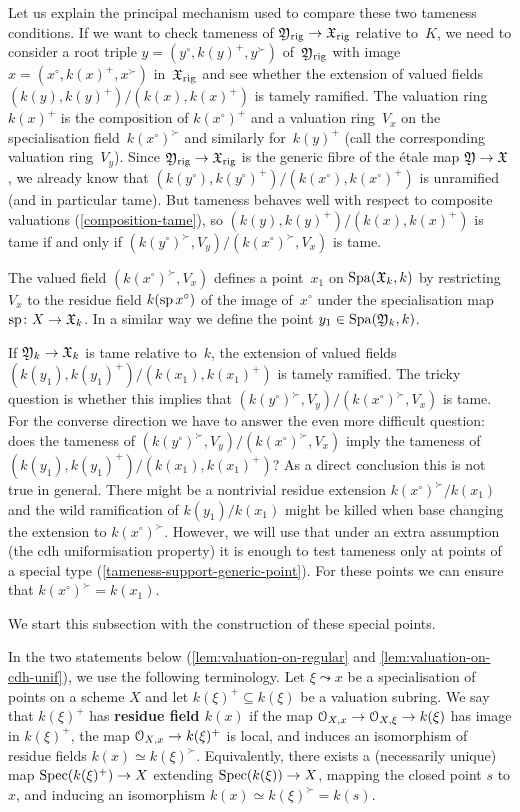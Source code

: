 \begin{rmk}
Let us explain the principal mechanism used to compare these two tameness conditions.
If we want to check tameness of ${\mathfrak{Y}}_{\rm rig} \to {\mathfrak{X}}_{\rm rig}$ relative to~$K$, we need to consider a root triple $y = (y^\circ,k(y)^+,y^\succ)$ of~${\mathfrak{Y}}_{\rm rig}$ with image $x = (x^\circ,k(x)^+,x^\succ)$ in~${\mathfrak{X}}_{\rm rig}$ and see whether the extension of valued fields $(k(y),k(y)^+)/(k(x),k(x)^+)$ is tamely ramified.
The valuation ring~$k(x)^+$ is the composition of $k(x^\circ)^+$ and a valuation ring~$V_x$ on the specialisation field~$k(x^\circ)^\succ$ and similarly for~$k(y)^+$ (call the corresponding valuation ring~$V_y$).
Since ${\mathfrak{Y}}_{\rm rig} \to {\mathfrak{X}}_{\rm rig}$ is the generic fibre of the \'etale map ${\mathfrak{Y}}\to {\mathfrak{X}}$, we already know that $(k(y^\circ),k(y^\circ)^+)/(k(x^\circ),k(x^\circ)^+)$ is unramified (and in particular tame).
But tameness behaves well with respect to composite valuations (\cref{composition-tame}), so $(k(y),k(y)^+)/(k(x),k(x)^+)$ is tame if and only if $(k(y^\circ)^\succ,V_y)/(k(x^\circ)^\succ,V_x)$ is tame.

The valued field $(k(x^\circ)^\succ,V_x)$ defines a point~$x_1$ on $\operatorname{Spa}({\mathfrak{X}}_k,k)$ by restricting~$V_x$ to the residue field $k(\operatorname{sp} x^\circ)$ of the image of~$x^\circ$ under the specialisation map $\operatorname{sp} \colon X \to {\mathfrak{X}}_k$.
In a similar way we define the point $y_1  \in \operatorname{Spa}({\mathfrak{Y}}_k,k)$. 

If ${\mathfrak{Y}}_k \to {\mathfrak{X}}_k$ is tame relative to~$k$, the extension of valued fields $(k(y_1),k(y_1)^+)/(k(x_1),k(x_1)^+)$ is tamely ramified.
The tricky question is whether this implies that $(k(y^\circ)^\succ,V_y)/(k(x^\circ)^\succ,V_x)$ is tame.
For the converse direction we have to answer the even more difficult question: does the tameness of $(k(y^\circ)^\succ,V_y)/(k(x^\circ)^\succ,V_x)$ imply the tameness of $(k(y_1),k(y_1)^+)/(k(x_1),k(x_1)^+)$?
As a direct conclusion this is not true in general. 
There might be a nontrivial residue extension $k(x^\circ)^\succ/k(x_1)$ and the wild ramification of $k(y_1)/k(x_1)$ might be killed when base changing the extension to $k(x^\circ)^\succ$.
However, we will use that under an extra assumption (the cdh uniformisation property) it is enough to test tameness only at points of a special type (\cref{tameness-support-generic-point}).
For these points we can ensure that $k(x^\circ)^\succ = k(x_1)$.

We start this subsection with the construction of these special points.
\end{rmk}

In the two statements below (\cref{lem:valuation-on-regular} and \cref{lem:valuation-on-cdh-unif}), we use the following terminology. Let $\xi\leadsto x$ be a specialisation of points on a scheme $X$ and let $k(\xi)^+\subseteq k(\xi)$ be a valuation subring. We say that $k(\xi)^+$ has {\bf residue field $k(x)$} if the map ${\mathcal O}_{X,x}\to {\mathcal O}_{X,\xi}\to k(\xi)$ has image in $k(\xi)^+$, the map ${\mathcal O}_{X,x}\to k(\xi)^+$ is local, and induces an isomorphism of residue fields $k(x)\simeq k(\xi)^\succ$. Equivalently, there exists a (necessarily unique) map $\operatorname{Spec}(k(\xi)^+)\to X$ extending $\operatorname{Spec}(k(\xi))\to X$, mapping the closed point $s$ to $x$, and inducing an isomorphism $k(x)\simeq k(\xi)^\succ =k(s)$. 

